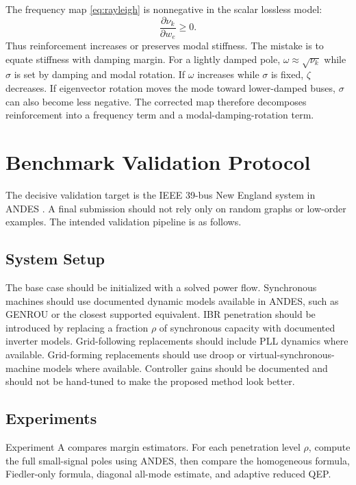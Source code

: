 \documentclass[journal]{IEEEtran}
\begin{document}
The frequency map \eqref{eq:rayleigh} is nonnegative in the scalar lossless model:
\begin{equation}
\frac{\partial\nu_k}{\partial w_e}\geq 0.
\end{equation}
Thus reinforcement increases or preserves modal stiffness. The mistake is to equate stiffness with damping margin. For a lightly damped pole, $\omega\approx\sqrt{\nu_k}$ while $\sigma$ is set by damping and modal rotation. If $\omega$ increases while $\sigma$ is fixed, $\zeta$ decreases. If eigenvector rotation moves the mode toward lower-damped buses, $\sigma$ can also become less negative. The corrected map therefore decomposes reinforcement into a frequency term and a modal-damping-rotation term.

\section{Benchmark Validation Protocol}

The decisive validation target is the IEEE 39-bus New England system in ANDES \cite{andesdocs}. A final submission should not rely only on random graphs or low-order examples. The intended validation pipeline is as follows.

\subsection{System Setup}

The base case should be initialized with a solved power flow. Synchronous machines should use documented dynamic models available in ANDES, such as GENROU or the closest supported equivalent. IBR penetration should be introduced by replacing a fraction $\rho$ of synchronous capacity with documented inverter models. Grid-following replacements should include PLL dynamics where available. Grid-forming replacements should use droop or virtual-synchronous-machine models where available. Controller gains should be documented and should not be hand-tuned to make the proposed method look better.

\subsection{Experiments}

Experiment A compares margin estimators. For each penetration level $\rho$, compute the full small-signal poles using ANDES, then compare the homogeneous formula, Fiedler-only formula, diagonal all-mode estimate, and adaptive reduced QEP.
\end{document}

